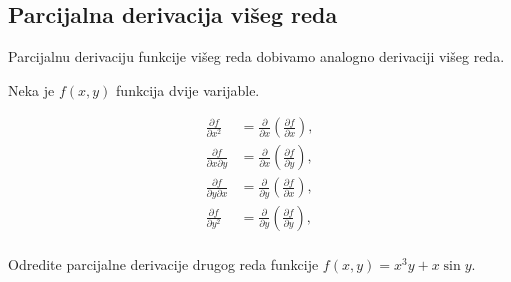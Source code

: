 \subsection{Parcijalna derivacija višeg reda}

Parcijalnu derivaciju funkcije višeg reda dobivamo analogno derivaciji višeg
reda.

Neka je $f(x,y)$ funkcija dvije varijable.

\begin{align*}
  \frac{\partial f}{\partial x^2} &= \frac{\partial}{\partial x} (\frac{\partial f}{\partial x}),\\
  \frac{\partial f}{\partial x \partial y} &= \frac{\partial}{\partial x} (\frac{\partial f}{\partial y}),\\
  \frac{\partial f}{\partial y \partial x} &= \frac{\partial}{\partial y} (\frac{\partial f}{\partial x}),\\
  \frac{\partial f}{\partial y^2} &= \frac{\partial}{\partial y} (\frac{\partial f}{\partial y}),\\
\end{align*}

\begin{example}
  Odredite parcijalne derivacije drugog reda funkcije $f(x,y)=x^3y+x\sin y$.
\end{example}
